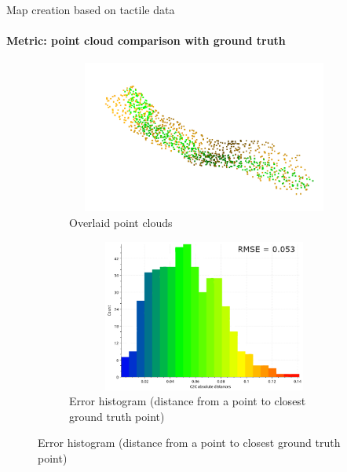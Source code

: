 \documentclass[aspectratio=169]{beamer}
\begin{document}
\begin{frame}[t]{Map creation based on tactile data}
    \framesubtitle{Metric: point cloud comparison with ground truth}
    \vspace{-15pt}
    \begin{figure}[H]
        \begin{subfigure}[t]{0.49\textwidth}
            \centering\includegraphics[height=5cm,width=1\textwidth,keepaspectratio]{cropped_pcd.png}
            \caption*{Overlaid point clouds}
        \end{subfigure}
        \begin{subfigure}[t]{0.49\textwidth}
            \centering\includegraphics[height=5cm,width=1\textwidth,keepaspectratio]{pcd_hist.png}
            \caption*{Error histogram (distance from a point to closest ground truth point)}
        \end{subfigure}
    \end{figure}
\end{frame}
\end{document}
